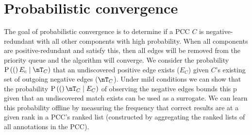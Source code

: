\section{Probabilistic convergence}\label{sec:coverge}

The goal of probabilistic convergence is to determine if a PCC $C$ is
  negative-redundant with all other components with high probability.
When all components are positive-redundant and satisfy this, then all edges
  will be removed from the priority queue and the algorithm will converge.
We consider the probability $\Pr(E_c \given \nT_C)$ that an undiscovered
  positive edge exists ($E_C$) given $C$'s existing set of outgoing negative
  edges ($\nT_C$).
Under mild conditions %
we can show that the probability $\Pr(\nT_C \given E_C)$ of observing the
  negative edges bounds this p given that an undiscovered match exists can be
  used as a surrogate.
We can learn this probability offline by measuring the frequency that correct
  results are at a given rank in a PCC's ranked list (constructed by aggregating
  the ranked lists of all annotations in the PCC).




